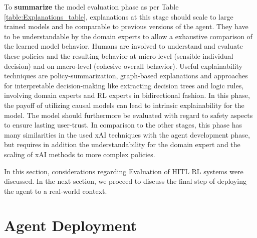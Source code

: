 \documentclass[twoside,11pt]{article}
\begin{document}
\begin{enumerate}
\noindent To \textbf{summarize} the model evaluation phase as per Table \ref{table:Explanations_table}, explanations at this stage should scale to large trained models and be comparable to previous versions of the agent. They have to be understandable by the domain experts to allow a exhaustive comparison of the learned model behavior. Humans are involved to understand and evaluate these policies and the resulting behavior at micro-level (sensible individual decision) and on macro-level (cohesive overall behavior). Useful explainability techniques are policy-summarization, graph-based explanations and approaches for interpretable decision-making like extracting decision trees and logic rules,  involving domain experts and RL experts in bidirectional fashion. In this phase, the payoff of utilizing causal models can lead to intrinsic explainability for the model. The model should furthermore be evaluated with regard to safety aspects to ensure lasting user-trust. In comparison to the other stages, this phase has many similarities in the used xAI techniques with the agent development phase, but requires in addition the understandability for the domain expert and the scaling of xAI methods to more complex policies.

In this section, considerations regarding Evaluation of HITL RL systems were discussed. In the next section, we proceed to discuss the final step of deploying the agent to a real-world context.

\section{Agent Deployment}
\label{sec:Deployment}


\end{enumerate}
\end{document}
